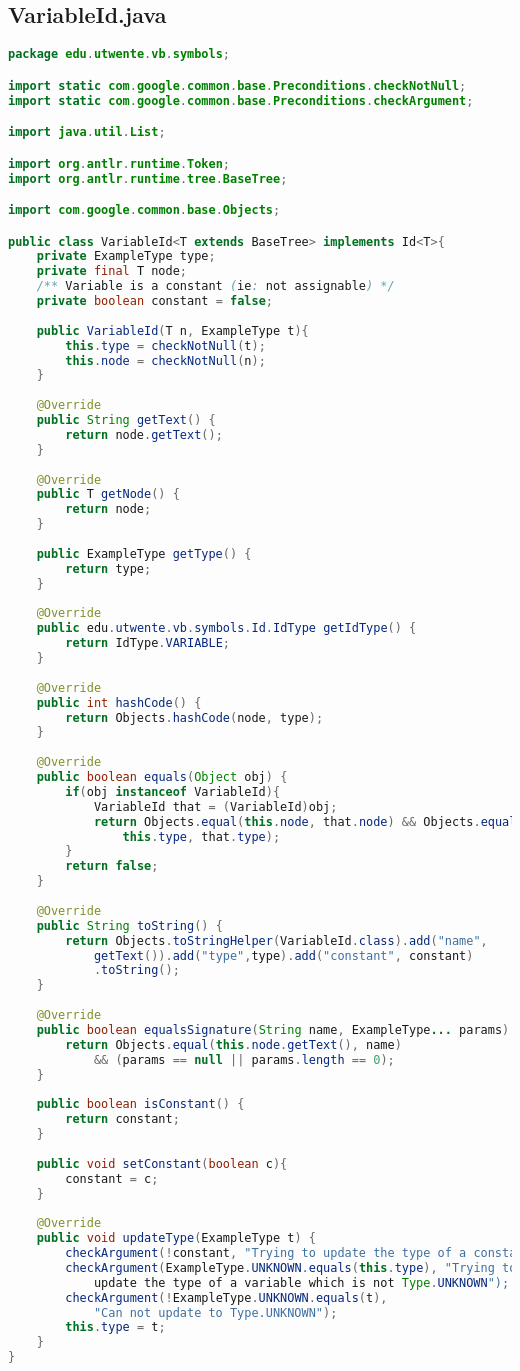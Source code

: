 \subsection{VariableId.java}
\begin{lstlisting}[language=Java]
package edu.utwente.vb.symbols;

import static com.google.common.base.Preconditions.checkNotNull;
import static com.google.common.base.Preconditions.checkArgument;

import java.util.List;

import org.antlr.runtime.Token;
import org.antlr.runtime.tree.BaseTree;

import com.google.common.base.Objects;

public class VariableId<T extends BaseTree> implements Id<T>{
	private ExampleType type;
	private final T node;
	/** Variable is a constant (ie: not assignable) */
	private boolean constant = false;
	
	public VariableId(T n, ExampleType t){
		this.type =	checkNotNull(t);
		this.node = checkNotNull(n);
	}
	
	@Override
	public String getText() {
		return node.getText();
	}
	
	@Override
	public T getNode() {
		return node;
	}
	
	public ExampleType getType() {
		return type;
	}
	
	@Override
	public edu.utwente.vb.symbols.Id.IdType getIdType() {
		return IdType.VARIABLE;
	}
	
	@Override
	public int hashCode() {
		return Objects.hashCode(node, type);
	}
	
	@Override
	public boolean equals(Object obj) {
		if(obj instanceof VariableId){
			VariableId that = (VariableId)obj;
			return Objects.equal(this.node, that.node) && Objects.equal(
                this.type, that.type);
		}
		return false;
	}
	
	@Override
	public String toString() {
		return Objects.toStringHelper(VariableId.class).add("name", 
            getText()).add("type",type).add("constant", constant)
            .toString();
	}
	
	@Override
	public boolean equalsSignature(String name, ExampleType... params) {
		return Objects.equal(this.node.getText(), name) 
            && (params == null || params.length == 0);
	}
	
	public boolean isConstant() {
		return constant;
	}
	
	public void setConstant(boolean c){
		constant = c;
	}
	
	@Override
	public void updateType(ExampleType t) {
		checkArgument(!constant, "Trying to update the type of a constant");
		checkArgument(ExampleType.UNKNOWN.equals(this.type), "Trying to 
            update the type of a variable which is not Type.UNKNOWN");
		checkArgument(!ExampleType.UNKNOWN.equals(t), 
            "Can not update to Type.UNKNOWN");
		this.type = t;
	}
}

\end{lstlisting}
